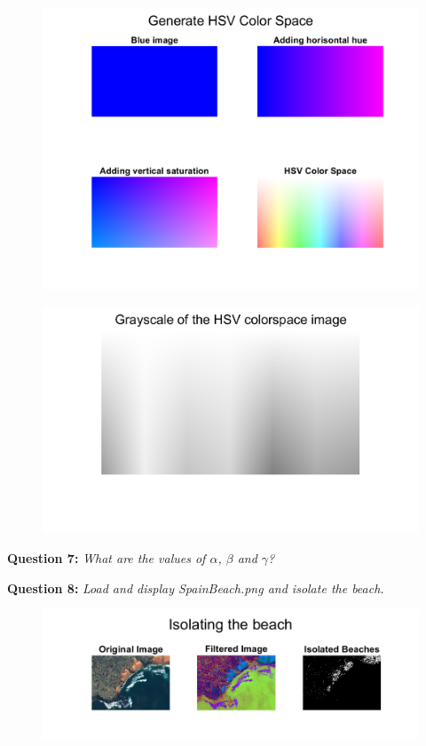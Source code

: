 \begin{figure}[H]
    \centering
    \includegraphics[width=0.75\linewidth]{Doc/Graphics/Part1/Part1_Question6a.png}
    \label{fig:enter-label}
\end{figure}

\begin{figure}[H]
    \centering
    \includegraphics[width=0.5\linewidth]{Doc/Graphics/Part1/Part1_Question6b.png}
    \label{fig:enter-label}
\end{figure}



\textbf{Question 7:}
\textit{What are the values of $\alpha$, $\beta$ and $\gamma$?}

\TODO{}



\textbf{Question 8:}
\textit{Load and display SpainBeach.png and isolate the beach.}


\begin{figure}[H]
    \centering
    \includegraphics[width=\linewidth]{Doc/Graphics/Part1/Part1_Question8.png}
    \label{fig:enter-label}
\end{figure}



